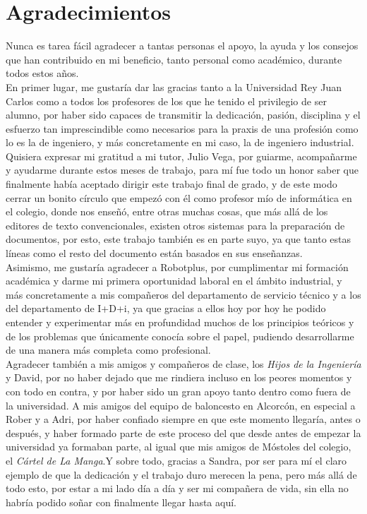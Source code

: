 \cleardoublepage

\chapter*{Agradecimientos}

Nunca es tarea fácil agradecer a tantas personas el apoyo, la ayuda y los consejos que han contribuido en mi beneficio, tanto personal como académico, durante todos estos años.\\

En primer lugar, me gustaría dar las gracias tanto a la Universidad Rey Juan Carlos como a todos los profesores de los que he tenido el privilegio de ser alumno, por haber sido capaces de transmitir la dedicación, pasión, disciplina y el esfuerzo tan imprescindible como necesarios para la praxis de una profesión como lo es la de ingeniero, y más concretamente en mi caso, la de ingeniero industrial.\\
Quisiera expresar mi gratitud a mi tutor, Julio Vega, por guiarme, acompañarme y ayudarme durante estos meses de trabajo, para mí fue todo un honor saber que finalmente había aceptado dirigir este trabajo final de grado, y de este modo cerrar un bonito círculo que empezó con él como profesor mío de informática en el colegio, donde nos enseñó, entre otras muchas cosas, que más allá de los editores de texto convencionales, existen otros sistemas para la preparación de documentos, por esto, este trabajo también es en parte suyo, ya que tanto estas líneas como el resto del documento están basados en sus enseñanzas.\\

Asimismo, me gustaría agradecer a Robotplus, por cumplimentar mi formación académica y darme mi primera oportunidad laboral en el ámbito industrial, y más concretamente a mis compañeros del departamento de servicio técnico y a los del departamento de I+D+i, ya que gracias a ellos hoy por hoy he podido entender y experimentar más en profundidad muchos de los principios teóricos y de los problemas que únicamente conocía sobre el papel, pudiendo desarrollarme de una manera más completa como profesional.\\

Agradecer también a mis amigos y compañeros de clase, los \textit{Hijos de la Ingeniería} y David, por no haber dejado que me rindiera incluso en los peores momentos y con todo en contra, y por haber sido un gran apoyo tanto dentro como fuera de la universidad. 
A mis amigos del equipo de baloncesto en Alcorcón, en especial a Rober y a Adri, por haber confiado siempre en que este momento llegaría, antes o después, y haber formado parte de este proceso del que desde antes de empezar la universidad ya formaban parte, al igual que mis amigos de Móstoles del colegio, el \textit{Cártel de La Manga}.Y sobre todo, gracias a Sandra, por ser para mí el claro ejemplo de que la dedicación y el trabajo duro merecen la pena, pero más allá de todo esto, por estar a mi lado día a día y ser mi compañera de vida, sin ella no habría podido soñar con finalmente llegar hasta aquí.\\


